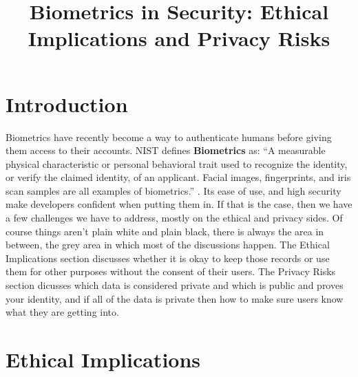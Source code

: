 \documentclass[conference]{IEEEtran}
\begin{document}
\title{Biometrics in Security: Ethical Implications and Privacy Risks}
\author{
    \vspace{0.05in}
}
\maketitle

\section{Introduction}

Biometrics have recently become a way to authenticate humans before giving them access to their accounts. NIST defines \textbf{Biometrics} as: ``A measurable physical characteristic or personal behavioral trait used to recognize the identity, or verify the claimed identity, of an applicant. Facial images, fingerprints, and iris scan samples are all examples of biometrics.'' \cite{nist_glossary_biometrics}. Its ease of use, and high security make developers confident when putting them in. If that is the case, then we have a few challenges we have to address, mostly on the ethical and privacy sides. Of course things aren't plain white and plain black, there is always the area in between, the grey area in which most of the discussions happen. The Ethical Implications section discusses whether it is okay to keep those records or use them for other purposes without the consent of their users. The Privacy Risks section dicusses which data is considered private and which is public and proves your identity, and if all of the data is private then how to make sure users know what they are getting into.

\section{Ethical Implications}
\end{document}
